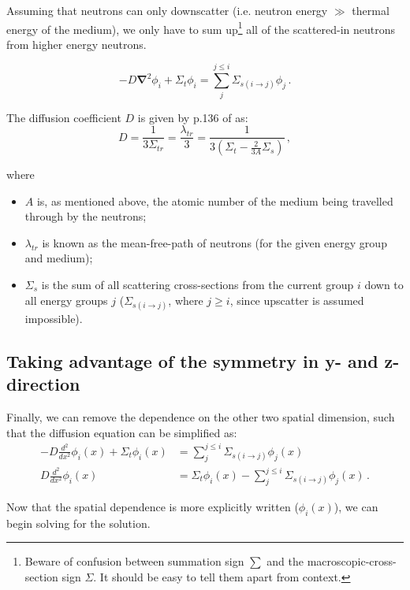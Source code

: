 \documentclass[a4paper, 12pt]{article}
\begin{document}
Assuming that neutrons can only downscatter (i.e. neutron energy $\gg$ thermal energy of the medium), we only have to sum up\footnote{Beware of confusion between summation sign $\sum$ and the macroscopic-cross-section sign $\Sigma$. It should be easy to tell them apart from context.} all of the scattered-in neutrons from higher energy neutrons.

\begin{equation}\label{eq:TransportEqFicksLawGroupwise}
    -D\boldsymbol{\nabla}^2\phi_i + \Sigma_t \phi_i =\sum_j^{j\le i} \Sigma_{s(i\rightarrow j)} \phi_j\,.
\end{equation}

The diffusion coefficient $D$ is given by p.136 of \cite{Duderstadt} as:
\begin{equation}
    D = \frac{1}{3\Sigma_{tr}} = \frac{\lambda_{tr}}{3} = \frac{1}{3(\Sigma_t - \frac{2}{3A}{\Sigma_s})}\,,
\end{equation}

where
\begin{itemize}
    \item $A$ is, as mentioned above, the atomic number of the medium being travelled through by the neutrons;
    \item $\lambda_{tr}$ is known as the mean-free-path of neutrons (for the given energy group and medium);
    \item $\Sigma_s$ is the sum of all scattering cross-sections from the current group $i$ down to all energy groups $j$ ($\Sigma_{s(i\rightarrow j)}$, where $j\ge i$, since upscatter is assumed impossible).
\end{itemize}

\subsection{Taking advantage of the symmetry in y- and z-direction}
Finally, we can remove the dependence on the other two spatial dimension, such that the diffusion equation can be simplified as:
\begin{align}
    -D \frac{d^2}{dx^2}\phi_i(x) + \Sigma_t \phi_i(x) &= \sum_j^{j\le i} \Sigma_{s(i\rightarrow j)} \phi_j(x)\\
    D \frac{d^2}{dx^2}\phi_i(x) &= \Sigma_t \phi_i(x)  -\sum_j^{j\le i} \Sigma_{s(i\rightarrow j)} \phi_j(x)\,.\label{eq:TransportEqX}
\end{align}

Now that the spatial dependence is more explicitly written ($\phi_i(x)$), we can begin solving for the solution.
\end{document}
